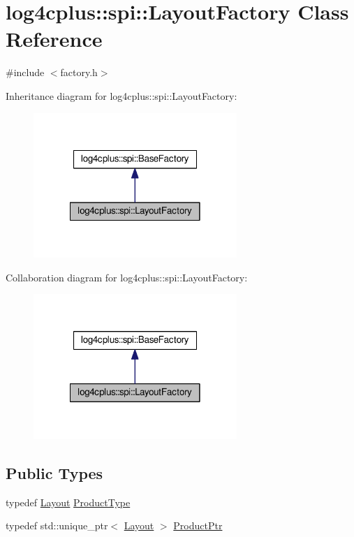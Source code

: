 \hypertarget{classlog4cplus_1_1spi_1_1LayoutFactory}{\section{log4cplus\-:\-:spi\-:\-:Layout\-Factory Class Reference}
\label{classlog4cplus_1_1spi_1_1LayoutFactory}
}


{\ttfamily \#include $<$factory.\-h$>$}



Inheritance diagram for log4cplus\-:\-:spi\-:\-:Layout\-Factory\-:
\nopagebreak
\begin{figure}[H]
\begin{center}
\leavevmode
\includegraphics[width=218pt]{classlog4cplus_1_1spi_1_1LayoutFactory__inherit__graph}
\end{center}
\end{figure}


Collaboration diagram for log4cplus\-:\-:spi\-:\-:Layout\-Factory\-:
\nopagebreak
\begin{figure}[H]
\begin{center}
\leavevmode
\includegraphics[width=218pt]{classlog4cplus_1_1spi_1_1LayoutFactory__coll__graph}
\end{center}
\end{figure}
\subsection*{Public Types}
\begin{DoxyCompactItemize}
\item 
typedef \hyperlink{classlog4cplus_1_1Layout}{Layout} \hyperlink{classlog4cplus_1_1spi_1_1LayoutFactory_a316c923d417b59529b25bbbe736d20bf}{Product\-Type}
\item 
typedef std\-::unique\-\_\-ptr$<$ \hyperlink{classlog4cplus_1_1Layout}{Layout} $>$ \hyperlink{classlog4cplus_1_1spi_1_1LayoutFactory_a6445a7082eb8f0b5f7795d242d9934a2}{Product\-Ptr}
\end{DoxyCompactItemize}
